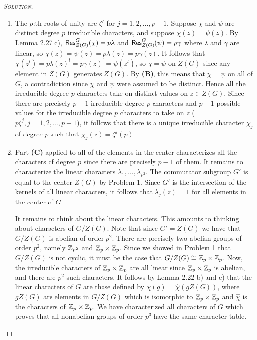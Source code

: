 \begin{proof}[{\scshape Solution}]
\begin{enumerate}[font=\normalfont,label=\textbf{(\Alph*)}, wide]
    \item The $p$:th roots of unity are $\zeta^j$ for $j = 1, 2, \ldots, p-1$. Suppose $\chi$ and $\psi$ are distinct degree $p$ irreducible characters, and suppose $\chi(z) = \psi(z)$. By Lemma 2.27 c), $\mathsf{Res}^G_{Z(G)}(\chi) = p\lambda$ and $\mathsf{Res}^G_{Z(G)}(\psi) = p\gamma$ where $\lambda$ and $\gamma$ are linear, so $\chi(z) = \psi(z) = p\lambda(z) = p \gamma(z)$. It follows that $\chi(z^l) = p\lambda(z)^l = p\gamma(z)^l = \psi(z^l)$, so $\chi =\psi$ on $Z(G)$ since any element in $Z(G)$ generates $Z(G)$. By \textbf{(B)}, this means that $\chi = \psi$ on all of $G$, a contradiction since $\chi$ and $\psi$ were assumed to be distinct. Hence all the irreducible degree $p$ characters take on distinct values on $z \in Z(G)$. Since there are precisely $p-1$ irreducible degree $p$ characters and $p-1$ possible values for the irreducible degree $p$ characters to take on $z$ ($p \zeta^j, j = 1, 2, \ldots, p-1$), it follows that there is a unique irreducible character $\chi_j$ of degree $p$ such that $\chi_j(z) = \zeta^j(p)$.


    \item Part \textbf{(C)} applied to all of the elements in the center characterizes all the characters of degree $p$ since there are precisely $p-1$ of them. It remains to characterize the linear characters $\lambda_1, \ldots, \lambda_{p^2}$. The commutator subgroup $G'$ is equal to the center $Z(G)$ by Problem 1. Since $G'$ is the intersection of the kernels of all linear characters, it follows that $\lambda_j(z) = 1$ for all elements in the center of $G$.

    It remains to think about the linear characters. This amounts to thinking about characters of $G/Z(G)$. Note that since $G'=Z(G)$ we have that $G/Z(G)$ is abelian of order $p^2$. There are precisely two abelian groups of order $p^2$, namely $\mathbb{Z}_{p^2}$ and $\mathbb{Z}_p\times \mathbb{Z}_p$. Since we showed in Problem 1 that $G/Z(G)$ is not cyclic, it must be the case that $G/Z(G) \cong \mathbb{Z}_p\times \mathbb{Z}_p$. Now, the irreducible characters of $\mathbb{Z}_p\times \mathbb{Z}_p$ are all linear since $\mathbb{Z}_p\times \mathbb{Z}_p$ is abelian, and there are $p^2$ such characters. It follows by Lemma 2.22 b) and c) that the linear characters of $G$ are those defined by $\chi(g)=\hat{\chi}(gZ(G))$, where $gZ(G)$ are elements in $G/Z(G)$ which is isomorphic to $\mathbb{Z}_p \times \mathbb{Z}_p$ and $\hat{\chi}$ is the characters of $\mathbb{Z}_p \times \mathbb{Z}_p$. We have characterized all characters of $G$ which proves that all nonabelian groups of order $p^3$ have the same character table.
\begin{comment}
    By Lemma 2.22, $\lambda_j$ are all constant on cosets of $Z(G)$. The cosets of $Z(G)$ partition $G$ and there are $\lvert G : Z(G)\rvert = p^2$ such cosets, so they are all of size $p$. The cosets can therefore be labelled $g_1Z(G), g_2 Z(G), \ldots, g_{p^2}Z(G)$, and it follows by linearity that $\lambda_j(x_{g_i}) = \lambda_j(g_i)$ for $x_{g_i} \in g_iZ(G)$.
\end{comment}




\end{enumerate}
\end{proof}
